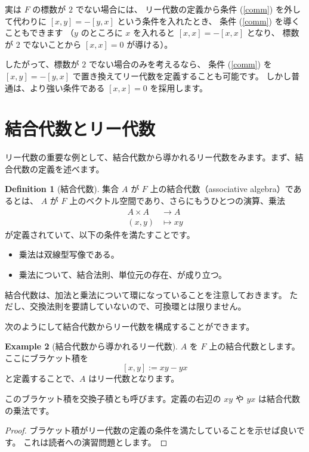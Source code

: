 \documentclass{ltjsarticle}
\theoremstyle{definition}
\newtheorem{definition}{Definition}[section]
\newtheorem{example}[definition]{Example}
\begin{document}
実は $F$ の標数が $2$ でない場合には、
リー代数の定義から条件 (\ref{comm}) を外して代わりに $[x, y] = -[y, x]$ という条件を入れたとき、
条件 (\ref{comm}) を導くこともできます
（$y$ のところに $x$ を入れると $[x, x] = -[x, x]$ となり、
標数が $2$ でないことから $[x, x] = 0$ が導ける）。

したがって、標数が $2$ でない場合のみを考えるなら、
条件 (\ref{comm}) を $[x, y] = -[y, x]$ で置き換えてリー代数を定義することも可能です。
しかし普通は、より強い条件である $[x, x] = 0$ を採用します。

\section{結合代数とリー代数}

リー代数の重要な例として、結合代数から導かれるリー代数をみます。まず、結合代数の定義を述べます。

\begin{definition}[結合代数]
    集合 $A$ が $F$ 上の結合代数（associative algebra）であるとは、
    $A$ が $F$ 上のベクトル空間であり、さらにもうひとつの演算、乗法
    \begin{align*}
        A \times A & \to A      \\
        (x, y)     & \mapsto xy
    \end{align*}
    が定義されていて、以下の条件を満たすことです。
    \begin{itemize}
        \item 乗法は双線型写像である。
        \item 乗法について、結合法則、単位元の存在、が成り立つ。
    \end{itemize}
\end{definition}

結合代数は、加法と乗法について環になっていることを注意しておきます。
ただし、交換法則を要請していないので、可換環とは限りません。

次のようにして結合代数からリー代数を構成することができます。

\begin{example}[結合代数から導かれるリー代数] \label{commutator}
    $A$ を $F$ 上の結合代数とします。
    ここにブラケット積を
    \[
        [x, y] := xy - yx
    \]
    と定義することで、$A$ はリー代数となります。
\end{example}

このブラケット積を交換子積とも呼びます。定義の右辺の $xy$ や $yx$ は結合代数の乗法です。

\begin{proof}
    ブラケット積がリー代数の定義の条件を満たしていることを示せば良いです。
    これは読者への演習問題とします。
\end{proof}
\end{document}

